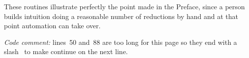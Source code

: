 These routines illustrate perfectly the point made in the Preface, 
since a person
builds intuition doing a reasonable number of reductions by hand and
at that point automation can take over.

\textit{Code comment:} lines~50 and~88 are too long
for this page so they end with a 
slash~\inlinecode{\\} to make \python{} continue on the
next line. 


\endinput


TODO:
